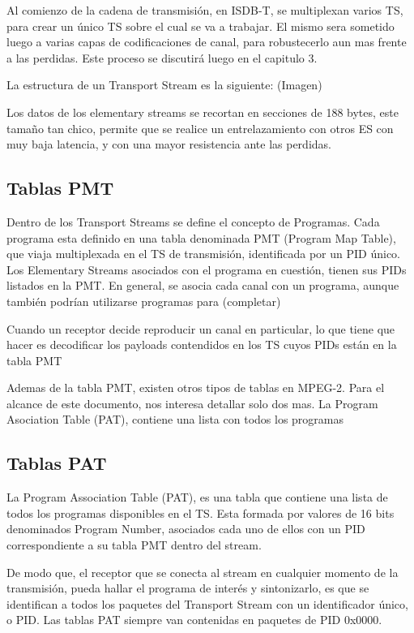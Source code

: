 	Al comienzo de la cadena de transmisión, en ISDB-T, se multiplexan varios TS, para crear un único TS sobre el cual se va a trabajar. El mismo sera sometido luego a varias capas de codificaciones de canal, para robustecerlo aun mas frente a las perdidas. Este proceso se discutirá luego en el capitulo 3.
	
	La estructura de un Transport Stream es la siguiente:
	(Imagen)
	
	Los datos de los elementary streams se recortan en secciones de 188 bytes, este tamaño tan chico, permite que se realice un entrelazamiento con otros ES con muy baja latencia, y con una mayor resistencia ante las perdidas.

	\subsection{Tablas PMT}

	Dentro de los Transport Streams se define el concepto de Programas. Cada programa esta definido en una tabla denominada PMT (Program Map Table), que viaja multiplexada en el TS de transmisión, identificada por un PID único. Los Elementary Streams asociados con el programa en cuestión, tienen sus PIDs listados en la PMT. En general, se asocia cada canal con un programa, aunque también podrían utilizarse programas para (completar)
	
	Cuando un receptor decide reproducir un canal en particular, lo que tiene que hacer es decodificar los payloads contendidos en los TS cuyos PIDs están en la tabla PMT
	
	Ademas de la tabla PMT, existen otros tipos de tablas en MPEG-2. Para el alcance de este documento, nos interesa detallar solo dos mas.
	La Program Asociation Table (PAT), contiene una lista con todos los programas 

	
	\subsection{Tablas PAT}
	La Program Association Table (PAT), es una tabla que contiene una lista de todos los programas disponibles en el TS. Esta formada por valores de 16 bits denominados Program Number, asociados cada uno de ellos con un PID correspondiente a su tabla PMT dentro del stream. 
	
	De modo que, el receptor que se conecta al stream en cualquier momento de la transmisión, pueda hallar el programa de interés y sintonizarlo, es que se identifican a todos los paquetes del Transport Stream con un identificador único, o PID. Las tablas PAT siempre van contenidas en paquetes de PID 0x0000.
	
